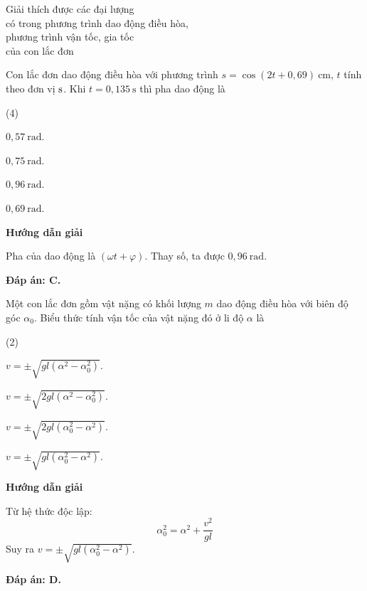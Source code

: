 \begin{dang}{Giải thích được các đại lượng\\ có trong phương trình dao động điều hòa,\\ phương trình vận tốc, gia tốc\\ của con lắc đơn}
	{
		Con lắc đơn dao động điều hòa với phương trình $s=\cos(2t+0,69)\ \text{cm}$, $t$ tính theo đơn vị $\text s$. Khi $t=0,135\ \text{s}$ thì pha dao động là
		\begin{mcq}(4)
			\item $0,57\ \text{rad}$.
			\item $0,75\ \text{rad}$.
			\item $0,96\ \text{rad}$.
			\item $0,69\ \text{rad}$.
		\end{mcq}
	}
	{\begin{center}
			\textbf{Hướng dẫn giải}
		\end{center}
		
		Pha của dao động là $(\omega t + \varphi)$. Thay số, ta được $0,96\ \text{rad}$.
		
		\textbf{Đáp án: C.}
	}
	{
		Một con lắc đơn gồm vật nặng có khối lượng $m$ dao động điều hòa với biên độ góc $\alpha_0$. Biểu thức tính vận tốc của vật nặng đó ở li độ $\alpha$ là
		\begin{mcq}(2)
			\item $v=\pm\sqrt{gl(\alpha^2-\alpha_0^2)}$.
			\item $v=\pm\sqrt{2gl(\alpha^2-\alpha_0^2)}$.
			\item $v=\pm\sqrt{2gl(\alpha_0^2-\alpha^2)}$.
			\item $v=\pm\sqrt{gl(\alpha_0^2-\alpha^2)}$.
		\end{mcq}
	}
	{
		\begin{center}
			\textbf{Hướng dẫn giải}
		\end{center}
		
		Từ hệ thức độc lập:
		$$\alpha^2_0 = \alpha^2 +\dfrac{v^2}{gl}$$
		Suy ra $v=\pm\sqrt{gl(\alpha_0^2-\alpha^2)}$.
		
		\textbf{Đáp án: D.}
	}
\end{dang}
